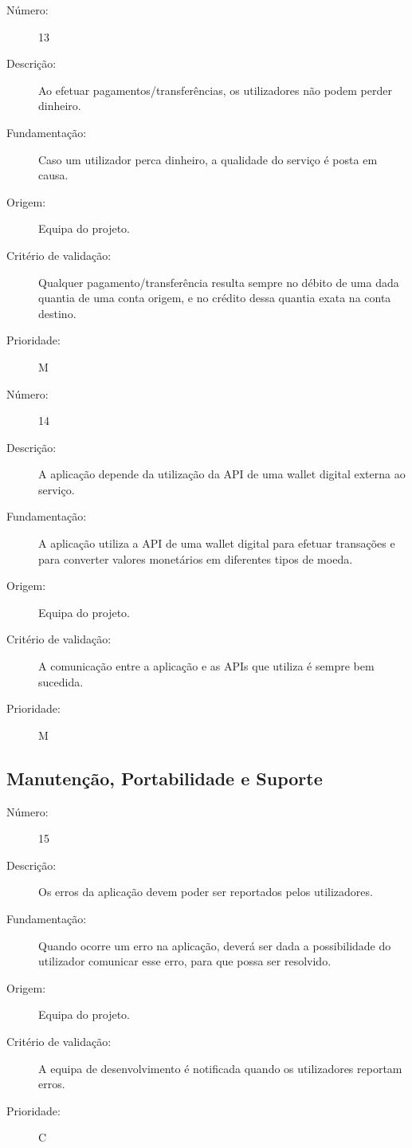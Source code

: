 \documentclass[12pt,a4paper]{article}
\begin{document}
     \begin{description}
        \item[Número:]13
        \item[Descrição:]Ao efetuar pagamentos/transferências, os utilizadores não podem perder dinheiro.
        \item[Fundamentação:]Caso um utilizador perca dinheiro, a qualidade do serviço é posta em causa.
        \item[Origem:] Equipa do projeto.
        \item[Critério de validação:] Qualquer pagamento/transferência resulta sempre no débito de uma dada quantia de uma conta origem, e no crédito dessa quantia exata na conta destino.
        \item[Prioridade:]M
      \end{description}
      \vspace{0.5cm}

      \begin{description}
        \item[Número:]14
        \item[Descrição:]A aplicação depende da utilização da API de uma wallet digital externa ao serviço.
        \item[Fundamentação:]A aplicação utiliza a API de uma wallet digital para efetuar transações e para converter valores monetários em diferentes tipos de moeda.
        \item[Origem:]Equipa do projeto.
        \item[Critério de validação:]A comunicação entre a aplicação e as APIs que utiliza é sempre bem sucedida.
        \item[Prioridade:]M
      \end{description}

  \subsection{Manutenção, Portabilidade e Suporte}    

      \begin{description}
        \item[Número:]15
        \item[Descrição:]Os erros da aplicação devem poder ser reportados pelos utilizadores.
        \item[Fundamentação:]Quando ocorre um erro na aplicação, deverá ser dada a possibilidade do utilizador comunicar esse erro, para que possa ser resolvido.
        \item[Origem:] Equipa do projeto.
        \item[Critério de validação:]A equipa de desenvolvimento é notificada quando os utilizadores reportam erros.
        \item[Prioridade:]C
      \end{description}
      \vspace{0.5cm}
\end{document}
